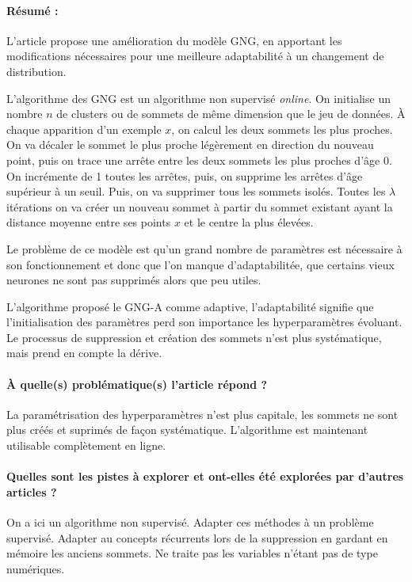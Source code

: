 \documentclass[11pt,a4paper]{report}
\begin{document}
\paragraph{Résumé :}L'article propose une amélioration du modèle GNG, en apportant les modifications nécessaires pour une meilleure adaptabilité à un changement de distribution.

L'algorithme des GNG est un algorithme non supervisé \textit{online}. On initialise un nombre $n$ de clusters ou de sommets de même dimension que le jeu de données. À chaque apparition d'un exemple $x$, on calcul les deux sommets les plus proches. On va décaler le sommet le plus proche légèrement en direction du nouveau point, puis on trace une arrête entre les deux sommets les plus proches d'âge 0. On incrémente de 1 toutes les arrêtes, puis, on supprime les arrêtes d'âge supérieur à un seuil. Puis, on va supprimer tous les sommets isolés. Toutes les $\lambda$ itérations on va créer un nouveau sommet à partir du sommet existant ayant la distance moyenne entre ses points $x$ et le centre la plus élevées.

Le problème de ce modèle est qu'un grand nombre de paramètres est nécessaire à son fonctionnement et donc que l'on manque d'adaptabilitée, que certains vieux neurones ne sont pas supprimés alors que peu utiles.

L'algorithme proposé le GNG-A comme adaptive, l'adaptabilité signifie que l'initialisation des paramètres perd son importance les hyperparamètres évoluant. Le processus de suppression et création des sommets n'est plus systématique, mais prend en compte la dérive. 

\paragraph{À quelle(s) problématique(s) l'article répond ? } La paramétrisation des hyperparamètres n'est plus capitale, les sommets ne sont plus créés et suprimés de façon systématique. L'algorithme est maintenant utilisable complètement en ligne.

\paragraph{Quelles sont les pistes à explorer et ont-elles  été explorées par d'autres articles ? } On a ici un algorithme non supervisé. Adapter ces méthodes à un problème supervisé. Adapter au concepts récurrents lors de la suppression en gardant en mémoire les anciens sommets. Ne traite pas les variables n'étant pas de type numériques.
\end{document}
